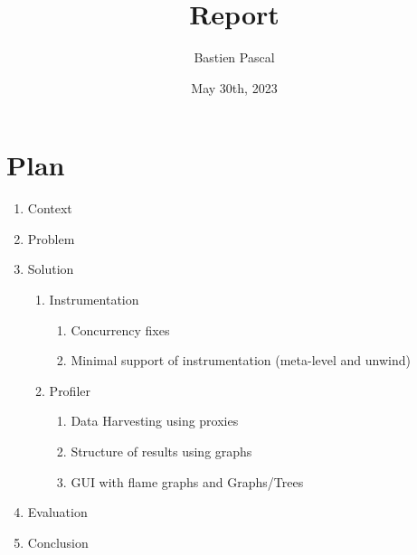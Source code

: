 \documentclass{article}
\title{Report}
\author{Bastien Pascal}
\date{May 30th, 2023}
\begin{document}
	\maketitle

	\section{Plan}

	\begin{enumerate}
		\item Context
		\item Problem
		\item Solution
		\begin{enumerate}
			\item Instrumentation
			\begin{enumerate}
				\item Concurrency fixes
				\item Minimal support of instrumentation (meta-level and unwind)
			\end{enumerate}
			\item Profiler
			\begin{enumerate}
				\item Data Harvesting using proxies
				\item Structure of results using graphs
				\item GUI with flame graphs and Graphs/Trees
			\end{enumerate}
		\end{enumerate}
		\item Evaluation
		\item Conclusion
	\end{enumerate}
\end{document}
